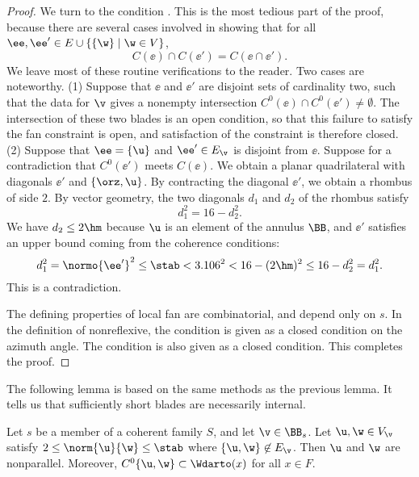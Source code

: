 \begin{proof}
We turn to the condition .  This is the most tedious part 
of the proof, because there are several cases involved in showing that 
for all $\ee ,\ee '\in E \cup \{\{\w\}\mid \w\in V\}$, 
\[ C(\ee )\cap C(\ee ') = C(\ee \cap \ee ').\] We leave most of these
routine verifications to the reader.  Two cases are noteworthy.  (1)
Suppose that $\ee$ and $\ee'$ are disjoint sets of cardinality two,
such that the data for $\v$ gives a nonempty intersection
$C^0(\ee)\cap C^0(\ee')\ne\emptyset$.  The intersection of these two
blades is an open condition, so that this failure to satisfy the fan
constraint is open, and satisfaction of the constraint is therefore
closed.  (2) Suppose that $\ee=\{\u\}$ and $\ee'\in E_\v$ is disjoint
from $\ee$.  Suppose for a contradiction that $C^0(\ee')$ meets
$C(\ee)$.  We obtain a planar quadrilateral with diagonals $\ee'$ and
$\{\orz,\u\}$.  By contracting the diagonal $\ee'$, we obtain a
rhombus of side $2$.  By vector geometry, the two diagonals $d_1$ and
$d_2$ of the rhombus satisfy
\begin{equation}\label{eqn:rhombus16}
d_1^2 = 16 - d_2^2.
\end{equation}
We have $d_2\le 2\hm$ because  $\u$ is an element of the annulus $\BB$,
 and $\ee'$ satisfies an upper bound coming from the
coherence conditions:
\begin{equation}\label{eqn:rhombus}
d_1^2 = \normo{\ee'}^2\le \stab< 3.106^2 <  
16-(2\hm)^2 \le 16-d_2^2 = d_1^2.
\end{equation}
This is a contradiction. 

The defining properties of local fan are combinatorial, and depend only on 
$s$.
In the definition of nonreflexive, the condition  is given
as a closed condition on the azimuth angle.  The condition
 is also given as a closed condition.
This completes the proof.
\end{proof}

The following lemma is based on the same methods as the previous
lemma.  It tells us that sufficiently short blades are necessarily
internal.

\begin{lemma}[]\label{lemma:2hm-slice}
Let $s$ be a member of a coherent family $S$, and let $\v\in \BB_s$.
Let $\u,\w\in V_\v$ satisfy $2\le\norm{\u}{\w}\le \stab$ where
$\{\u,\w\}\not\in E_\v$.  Then $\u$ and $\w$ are nonparallel.
Moreover,
$C^0\{\u,\w\}\subset \Wdarto(x)$ for all $x\in F$.
\end{lemma}

